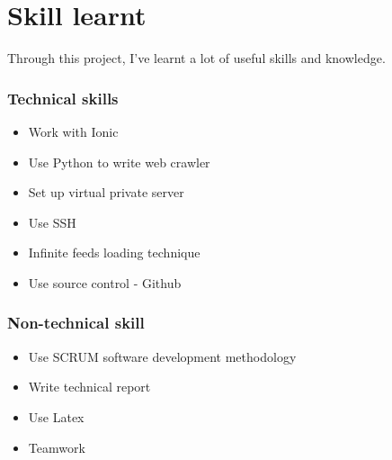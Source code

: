 \chapter{Skill learnt}
Through this project, I've learnt a lot of useful skills and knowledge.
\subsection{Technical skills}
\begin{itemize}
\item{Work with Ionic}
\item{Use Python to write web crawler}
\item{Set up virtual private server}
\item{Use SSH}
\item{Infinite feeds loading technique}
\item{Use source control - Github}
\end{itemize}
\subsection{Non-technical skill}
\begin{itemize}
\item{Use SCRUM software development methodology}
\item{Write technical report}
\item{Use Latex}
\item{Teamwork}
\end{itemize}